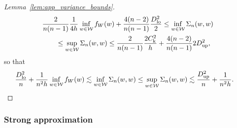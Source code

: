\begin{proof}[Lemma~\ref{lem:app_variance_bounds}]
\begin{align*}
    &\frac{2}{n(n-1)}
    \frac{1}{4h}
    \inf_{w \in \mathcal{W}} f_W(w)
    + \frac{4(n-2)}{n(n-1)}
    \frac{D_{\textup{lo}}^2}{2}
    \leq
    \inf_{w \in \mathcal{W}} \Sigma_n(w,w) \\
    &\qquad\leq
    \sup_{w \in \mathcal{W}} \Sigma_n(w,w)
    \leq
    \frac{2}{n(n-1)}
    \frac{2 C_\mathrm{k}^2}{h}
    + \frac{4(n-2)}{n(n-1)}
    2 D_{\textup{up}}^2,
  \end{align*}
  so that
  \begin{align*}
    \frac{D_{\textup{lo}}^2}{n}
    + \frac{1}{n^2h}
    \inf_{w \in \mathcal{W}} f_W(w)
    &\lesssim
    \inf_{w \in \mathcal{W}} \Sigma_n(w,w)
    \leq
    \sup_{w \in \mathcal{W}} \Sigma_n(w,w)
    \lesssim
    \frac{D_{\textup{up}}^2}{n}
    + \frac{1}{n^2h}.
  \end{align*}
\end{proof}

\subsubsection{Strong approximation}

